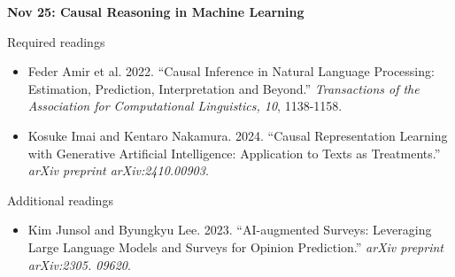 \documentclass[12pt]{article}
\begin{document}
\vspace{1em} \noindent \textbf{\textcolor{titlecolor}{Nov 25: Causal Reasoning in Machine Learning}}

\noindent Required readings
\begin{itemize}
    \item Feder Amir et al. 2022. ``Causal Inference in Natural Language Processing: Estimation, Prediction, Interpretation and Beyond.'' \textit{Transactions of the Association for Computational Linguistics, 10}, 1138-1158.
    \item Kosuke Imai and Kentaro Nakamura. 2024. ``Causal Representation Learning with Generative Artificial Intelligence: Application to Texts as Treatments.'' \textit{arXiv preprint arXiv:2410.00903}.
\end{itemize}

\noindent Additional readings
\begin{itemize}
    \item Kim Junsol and Byungkyu Lee. 2023. ``AI-augmented Surveys: Leveraging Large Language Models and Surveys for Opinion Prediction.'' \textit{arXiv preprint arXiv:2305. 09620}.
\end{itemize}
\end{document}
